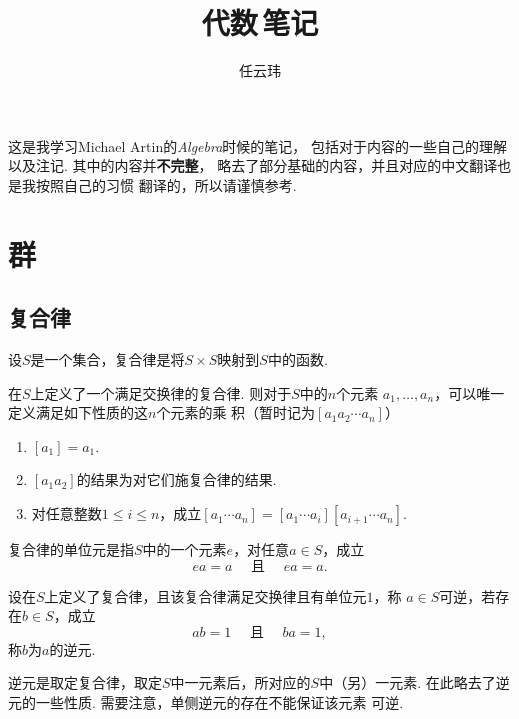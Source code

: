 

\title{代数$\,$笔记}
\author{任云玮}
\date{}



\maketitle
\tableofcontents
\newpage

  这是我学习Michael Artin的\textit{Algebra}时候的笔记，
  包括对于内容的一些自己的理解以及注记. 其中的内容并\textbf{不完整}，
  略去了部分基础的内容，并且对应的中文翻译也是我按照自己的习惯
  翻译的，所以请谨慎参考.



\newpage
\section{群}

\subsection{复合律}

  \begin{defi}
    设$S$是一个集合，复合律是将$S\times S$映射到$S$中的函数.
  \end{defi}

  \begin{pos}[唯一性]
    在$S$上定义了一个满足交换律的复合律. 则对于$S$中的$n$个元素
    $a_1,\dots,a_n$，可以唯一定义满足如下性质的这$n$个元素的乘
    积（暂时记为$[a_1a_2\cdots a_n]$）
    \begin{enumerate}
      \item $[a_1]=a_1$.
      \item $[a_1a_2]$的结果为对它们施复合律的结果.
      \item 对任意整数$1\le i\le n$，成立$[a_1\cdots a_n] =
        [a_1\cdots a_i][a_{i+1}\cdots a_n]$.
    \end{enumerate}
  \end{pos}

  \begin{defi}[单位元]
    复合律的单位元是指$S$中的一个元素$e$，对任意$a\in S$，成立
    \[
      ea=a \quad \text{ 且 } \quad ea = a.
    \]
  \end{defi}

  \begin{defi}[逆]
    设在$S$上定义了复合律，且该复合律满足交换律且有单位元$1$，称
    $a\in S$可逆，若存在$b\in S$，成立
    \[
      ab=1 \quad \text{ 且 } \quad ba = 1,
    \]
    称$b$为$a$的逆元.
  \end{defi}
  \remark
    逆元是取定复合律，取定$S$中一元素后，所对应的$S$中（另）一元素.
    在此略去了逆元的一些性质. 需要注意，单侧逆元的存在不能保证该元素
    可逆.


